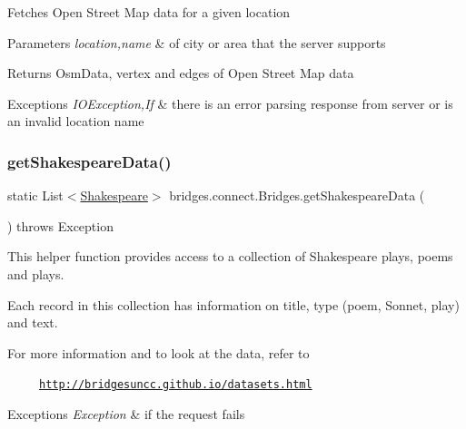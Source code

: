Fetches Open Street Map data for a given location 
\begin{DoxyParams}{Parameters}
{\em location,name} & of city or area that the server supports \\
\hline
\end{DoxyParams}
\begin{DoxyReturn}{Returns}
Osm\+Data, vertex and edges of Open Street Map data 
\end{DoxyReturn}

\begin{DoxyExceptions}{Exceptions}
{\em I\+O\+Exception,If} & there is an error parsing response from server or is an invalid location name \\
\hline
\end{DoxyExceptions}
\mbox{\label{classbridges_1_1connect_1_1_bridges_adc8d19f28677afb03db53736455de2d0}} 
\subsubsection{\texorpdfstring{get\+Shakespeare\+Data()}{getShakespeareData()}\hspace{0.1cm}{\footnotesize\ttfamily [1/3]}}
{\footnotesize\ttfamily static List$<$\mbox{\hyperlink{classbridges_1_1data__src__dependent_1_1_shakespeare}{Shakespeare}}$>$ bridges.\+connect.\+Bridges.\+get\+Shakespeare\+Data (\begin{DoxyParamCaption}{ }\end{DoxyParamCaption}) throws Exception\hspace{0.3cm}{\ttfamily [static]}}

This helper function provides access to a collection of Shakespeare plays, poems and plays.

Each record in this collection has information on title, type (poem, Sonnet, play) and text. ~\newline


For more information and to look at the data, refer to 

~~~~~\href{http://bridgesuncc.github.io/datasets.html}{\tt http\+://bridgesuncc.\+github.\+io/datasets.\+html} 


\begin{DoxyExceptions}{Exceptions}
{\em Exception} & if the request fails\\
\hline
\end{DoxyExceptions}

